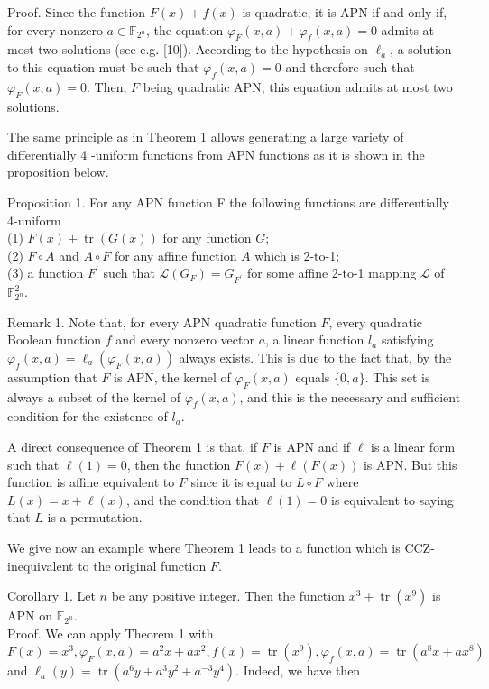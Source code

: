 \documentclass[10pt]{article}
\begin{document}
Proof. Since the function $F(x)+f(x)$ is quadratic, it is APN if and only if, for every nonzero $a \in \mathbb{F}_{2^{n}}$, the equation $\varphi_{F}(x, a)+\varphi_{f}(x, a)=0$ admits at most two solutions (see e.g. [10]). According to the hypothesis on $\ell_{a}$, a solution to this equation must be such that $\varphi_{f}(x, a)=0$ and therefore such that $\varphi_{F}(x, a)=0$. Then, $F$ being quadratic APN, this equation admits at most two solutions.

The same principle as in Theorem 1 allows generating a large variety of differentially 4 -uniform functions from APN functions as it is shown in the proposition below.

Proposition 1. For any APN function F the following functions are differentially 4-uniform\\
(1) $F(x)+\operatorname{tr}(G(x))$ for any function $G$;\\
(2) $F \circ A$ and $A \circ F$ for any affine function $A$ which is 2-to-1;\\
(3) a function $F^{\prime}$ such that $\mathcal{L}\left(G_{F}\right)=G_{F^{\prime}}$ for some affine 2-to-1 mapping $\mathcal{L}$ of $\mathbb{F}_{2^{n}}^{2}$.

Remark 1. Note that, for every APN quadratic function $F$, every quadratic Boolean function $f$ and every nonzero vector $a$, a linear function $l_{a}$ satisfying $\varphi_{f}(x, a)=\ell_{a}\left(\varphi_{F}(x, a)\right)$ always exists. This is due to the fact that, by the assumption that $F$ is APN, the kernel of $\varphi_{F}(x, a)$ equals $\{0, a\}$. This set is always a subset of the kernel of $\varphi_{f}(x, a)$, and this is the necessary and sufficient condition for the existence of $l_{a}$.

A direct consequence of Theorem 1 is that, if $F$ is APN and if $\ell$ is a linear form such that $\ell(1)=0$, then the function $F(x)+\ell(F(x))$ is APN. But this function is affine equivalent to $F$ since it is equal to $L \circ F$ where $L(x)=x+\ell(x)$, and the condition that $\ell(1)=0$ is equivalent to saying that $L$ is a permutation.

We give now an example where Theorem 1 leads to a function which is CCZ-inequivalent to the original function $F$.

Corollary 1. Let $n$ be any positive integer. Then the function $x^{3}+\operatorname{tr}\left(x^{9}\right)$ is APN on $\mathbb{F}_{2^{n}}$.\\
Proof. We can apply Theorem 1 with $F(x)=x^{3}, \varphi_{F}(x, a)=a^{2} x+a x^{2}, f(x)=\operatorname{tr}\left(x^{9}\right), \varphi_{f}(x, a)=\operatorname{tr}\left(a^{8} x+\right. \left.a x^{8}\right)$ and $\ell_{a}(y)=\operatorname{tr}\left(a^{6} y+a^{3} y^{2}+a^{-3} y^{4}\right)$. Indeed, we have then
\end{document}
